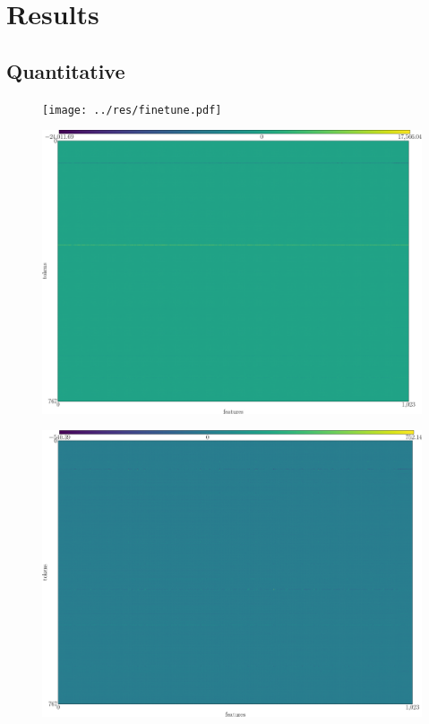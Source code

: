 \documentclass{article}
\begin{document}
\section{Results}
\subsection{Quantitative}
\begin{figure}
\texttt{[image: ../res/finetune.pdf]}
\end{figure}

\begin{figure}
\includegraphics[width=\textwidth]{../res/sp16.png}
\end{figure}

\begin{figure}
\includegraphics[width=\textwidth]{../res/mup16.png}
\end{figure}
\end{document}
